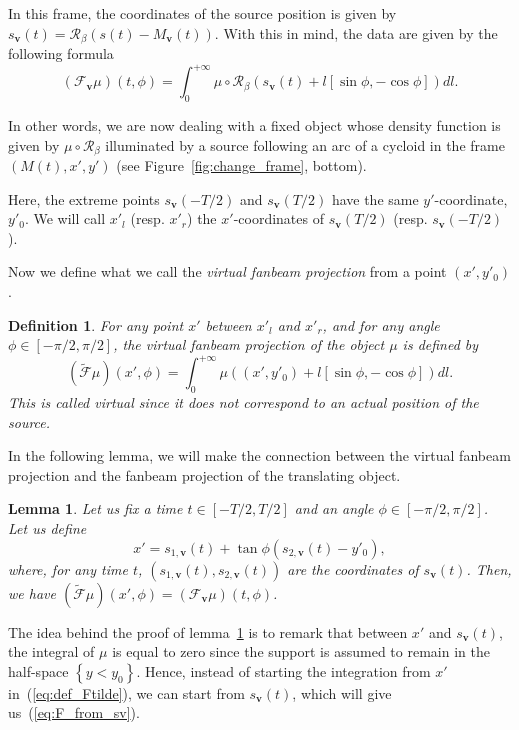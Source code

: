 \documentclass[twocolumn]{IEEEtran}
\newcommand{\bv}{\mathbf{v}}
\newcommand{\Mbv}{M_{\mathbf{v}}}
\newcommand{\Tbv}{\mathcal{F}_{\mathbf{v}}}
\newcommand{\sbv}{s_{\mathbf{v}}}
\newtheorem{definition}{Definition}
\newtheorem{lemma}{Lemma}
\begin{document}
In this frame, the coordinates of the source position is given by $\sbv(t)=\mathcal{R}_{\beta} \left( s(t)-\Mbv(t) \right)$. With this in mind, the data are given by the following formula
\begin{equation}
	(\Tbv\mu)(t,\phi) = \int_0^{+\infty} \mu \circ \mathcal{R}_{\beta} \left( s_{\bv}(t) + l \left[ \sin \phi, -\cos \phi \right] \right) dl.
\label{eq:F_from_sv}
\end{equation}

In other words, we are now dealing with a fixed object whose density function is given by $\mu \circ \mathcal{R}_{\beta}$ illuminated by a source following an arc of a cycloid in the frame $\left(M(t), x', y'\right)$ (see Figure~\ref{fig:change_frame}, bottom).

Here, the extreme points $\sbv(-T/2)$ and $\sbv(T/2)$ have the same $y'$-coordinate, $y'_0$. We will call $x'_l$ (resp. $x'_r$) the $x'$-coordinates of $\sbv(T/2)$ (resp. $\sbv(-T/2)$).

Now we define what we call the \emph{virtual fanbeam projection} from a point $(x',y'_0)$.
\begin{definition}
	For any point $x'$ between $x'_l$ and $x'_r$, and for any angle $\phi \in \left[ -\pi/2, \pi/2\right]$, the \emph{virtual fanbeam projection} of the object $\mu$ is defined by
\begin{equation}
	\left( \tilde{\mathcal{F}}\mu	\right)(x',\phi) = \int_0^{+\infty} \mu \left( (x',y'_0) + l \left[ \sin \phi, -\cos \phi \right] \right) dl.
\label{eq:def_Ftilde}
\end{equation}
This is called \emph{virtual} since it does not correspond to an actual position of the source.
\end{definition}

In the following lemma, we will make the connection between the virtual fanbeam projection and the fanbeam projection of the translating object.
\begin{lemma}
	Let us fix a time $t \in \left[ -T/2, T/2\right]$ and an angle $\phi \in \left[ -\pi/2, \pi/2\right]$. Let us define
	\begin{equation}
		x' = s_{1,\bv}(t) + \tan \phi \left( s_{2,\bv}(t) - y'_0 \right),
		\label{eq:x'}
	\end{equation}
	where, for any time $t$, $\left( s_{1,\bv}(t), s_{2,\bv}(t) \right)$ are the coordinates of $\sbv(t)$.
	Then, we have $\left( \tilde{\mathcal{F}}\mu \right)(x',\phi) = \left( \Tbv \mu \right)(t,\phi)$.
\label{lem:T_x_t}
\end{lemma}
The idea behind the proof of lemma~\ref{lem:T_x_t} is to remark that between $x'$ and $\sbv(t)$, the integral of $\mu$ is equal to zero since the support is assumed to remain in the half-space $\left\{ y<y_0 \right\}$. Hence, instead of starting the integration from $x'$ in~(\ref{eq:def_Ftilde}), we can start from $\sbv(t)$, which will give us~(\ref{eq:F_from_sv}).
\end{document}
